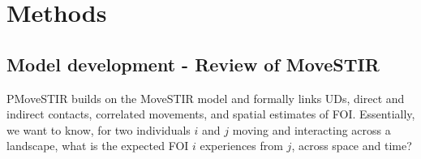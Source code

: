 ﻿\documentclass[11pt]{article}
\begin{document}

\section*{Methods}

\subsection*{Model development - Review of MoveSTIR}

PMoveSTIR builds on the MoveSTIR model \citep{Wilber2022} and formally links UDs, direct and indirect contacts, correlated movements, and spatial estimates of FOI. Essentially, we want to know, for two individuals $i$ and $j$ moving and interacting across a landscape, what is the expected FOI $i$ experiences from $j$, across space and time? 
\end{document}
